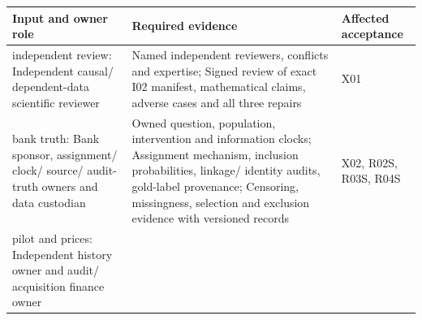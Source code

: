 \documentclass[
  10pt,
]{article}
\begin{document}
\begin{longtable}[]{@{}>{\raggedright\arraybackslash}p{}>{\raggedright\arraybackslash}p{}>{\raggedright\arraybackslash}p{}@{}}
\toprule
\begin{minipage}[b]{\linewidth}\raggedright
Input and owner role\strut
\end{minipage} & \begin{minipage}[b]{\linewidth}\raggedright
Required evidence\strut
\end{minipage} & \begin{minipage}[b]{\linewidth}\raggedright
Affected acceptance\strut
\end{minipage}\tabularnewline
\midrule
\endhead
\begin{minipage}[t]{\linewidth}\raggedright
independent review: Independent causal/ dependent-data scientific
reviewer\strut
\end{minipage} & \begin{minipage}[t]{\linewidth}\raggedright
Named independent reviewers, conflicts and expertise; Signed review of
exact I02 manifest, mathematical claims, adverse cases and all three
repairs\strut
\end{minipage} & \begin{minipage}[t]{\linewidth}\raggedright
X01\strut
\end{minipage}\tabularnewline
\begin{minipage}[t]{\linewidth}\raggedright
bank truth: Bank sponsor, assignment/ clock/ source/ audit-truth owners
and data custodian\strut
\end{minipage} & \begin{minipage}[t]{\linewidth}\raggedright
Owned question, population, intervention and information clocks;
Assignment mechanism, inclusion probabilities, linkage/ identity audits,
gold-label provenance; Censoring, missingness, selection and exclusion
evidence with versioned records\strut
\end{minipage} & \begin{minipage}[t]{\linewidth}\raggedright
X02, R02S, R03S, R04S\strut
\end{minipage}\tabularnewline
\begin{minipage}[t]{\linewidth}\raggedright
pilot and prices: Independent history owner and audit/ acquisition
finance owner\strut
\end{minipage} & \begin{minipage}[t]{\linewidth}\raggedright

\end{minipage}
\end{longtable}
\end{document}
